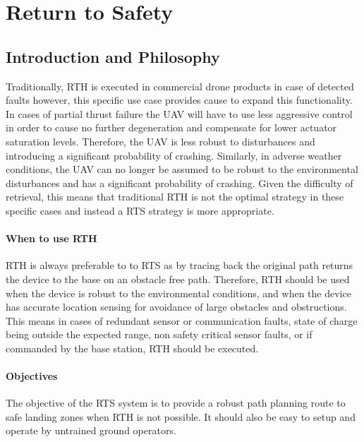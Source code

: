 \newpage
{}
\section{Return to Safety} \label{Return to Safety}

\subsection{Introduction and Philosophy}
Traditionally, \gls{RTH} is executed in commercial drone products in case of detected faults however, this specific use case provides cause to expand this functionality. In cases of partial thrust failure the \gls{UAV} will have to use less aggressive control in order to cause no further degeneration and compensate for lower actuator saturation levels. Therefore, the \gls{UAV} is less robust to disturbances and introducing a significant probability of crashing. Similarly, in adverse weather conditions, the \gls{UAV} can no longer be assumed to be robust to the environmental disturbances and has a significant probability of crashing. Given the difficulty of retrieval, this means that traditional \gls{RTH} is not the optimal strategy in these specific cases and instead a \gls{RTS} strategy is more appropriate.
\paragraph{When to use \gls{RTH}}
\gls{RTH} is always preferable to to \gls{RTS} as by tracing back the original path returns the device to the base on an obstacle free path. Therefore, \gls{RTH} should be used when the device is robust to the environmental conditions, and when the device has accurate location sensing for avoidance of large obstacles and obstructions. This means in cases of redundant sensor or communication faults, state of charge being outside the expected range, non safety critical sensor faults, or if commanded by the base station, \gls{RTH} should be executed.
\paragraph{Objectives}
The objective of the \gls{RTS} system is to provide a robust path planning route to safe landing zones when \gls{RTH} is not possible. It should also be easy to setup and operate by untrained ground operators.



